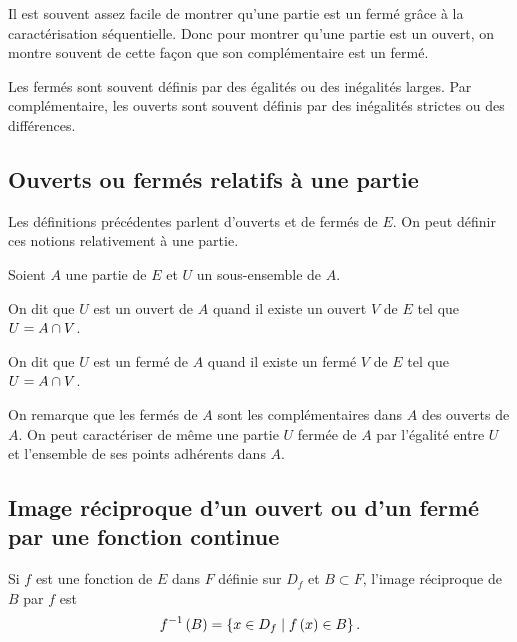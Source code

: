 \begin{rem}
Il est souvent assez facile de montrer qu'une partie est un fermé grâce à la caractérisation séquentielle. Donc pour montrer qu'une partie est un ouvert, on montre souvent de cette façon que son complémentaire est un fermé.

Les fermés sont souvent définis par des égalités ou des inégalités larges. Par complémentaire, les ouverts sont souvent définis par des inégalités strictes ou des différences.
\end{rem}

\subsection{Ouverts ou fermés relatifs à une partie}

Les définitions précédentes parlent d'ouverts et de fermés de \(E\). On peut définir ces notions relativement à une partie.

\begin{defi}
Soient \(A\) une partie de \(E\) et \(U\) un sous-ensemble de \(A\).

On dit que \(U\) est un ouvert de \(A\) quand il existe un ouvert \(V\) de \(E\) tel que \(U=A\cap V\).

On dit que \(U\) est un fermé de \(A\) quand il existe un fermé \(V\) de \(E\) tel que \(U=A\cap V\).
\end{defi}

On remarque que les fermés de \(A\) sont les complémentaires dans \(A\) des ouverts de \(A\). On peut caractériser de même une partie \(U\) fermée de \(A\) par l'égalité entre \(U\) et l'ensemble de ses points adhérents dans \(A\).

\subsection{Image réciproque d'un ouvert ou d'un fermé par une fonction continue}

\begin{rappel}
Si \(f\) est une fonction de \(E\) dans \(F\) définie sur \(D_f\) et \(B\subset F\), l'image réciproque de \(B\) par \(f\) est \[f^{-1}\left(B\right)=\left\lbrace x\in D_f\;\middle|\; f\left(x\right)\in B\right\rbrace.\]
\end{rappel}

